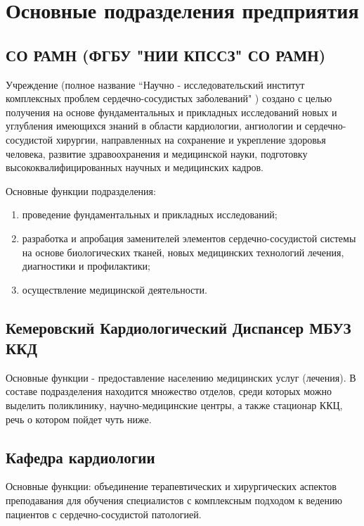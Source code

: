 \section{Основные подразделения предприятия}

\subsection{СО РАМН (ФГБУ "НИИ КПССЗ" СО РАМН)}
Учреждение (полное название “Научно - исследовательский институт комплексных
проблем сердечно-сосудистых заболеваний" ) создано с целью получения на основе
фундаментальных и прикладных исследований новых и углубления имеющихся знаний в
области  кардиологии, ангиологии и сердечно-сосудистой хирургии, направленных на
сохранение и укрепление здоровья человека, развитие здравоохранения и
медицинской науки, подготовку высококвалифицированных научных и медицинских
кадров.

Основные функции подразделения:
\begin{enumerate}
	\item проведение фундаментальных и прикладных исследований;
	\item разработка и апробация заменителей элементов сердечно-сосудистой системы
на основе биологических тканей, новых медицинских технологий лечения, 
диагностики и профилактики;
	\item осуществление медицинской деятельности.
\end{enumerate}

\subsection{Кемеровский Кардиологический Диспансер МБУЗ ККД}
Основные функции - предоставление населению медицинских услуг (лечения). В
составе подразделения находится множество отделов, среди которых можно выделить
поликлинику, научно-медицинские центры, а также стационар ККЦ, речь о котором
пойдет чуть ниже.

\subsection{Кафедра кардиологии}
Основные функции:  объединение терапевтических и хирургических аспектов
преподавания для обучения специалистов с комплексным подходом к ведению
пациентов с сердечно-сосудистой патологией.
